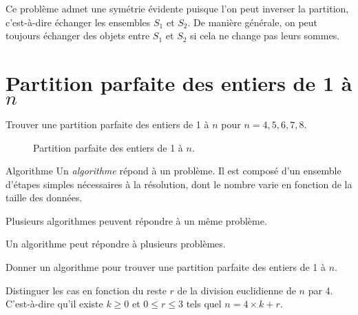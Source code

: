 \documentclass[11pt]{article}
\begin{document}
\begin{remarque}{}
    Ce problème admet une symétrie évidente puisque l'on peut inverser la partition, c'est-à-dire échanger les ensembles $S_1$ et $S_2$.
    De manière générale, on peut toujours échanger des objets entre $S_1$ et $S_2$ si cela ne change pas leurs sommes.
 \end{remarque}

\section{Partition parfaite des entiers de 1 à $n$}

\begin{exercice}{}
  Trouver une partition parfaite des entiers de 1 à $n$ pour $n =4, 5, 6, 7, 8$.
  \end{exercice}


  \begin{figure}[htbp]
    \centering
    \resizebox{0.6\linewidth}{!}{
      
    }
    \caption{Partition parfaite des entiers de 1 à $n$.}
  \end{figure}


  \begin{definition}{Algorithme}
    Un \emph{algorithme} répond à un problème. Il est composé d’un ensemble d’étapes simples nécessaires à la résolution, dont le nombre varie en fonction de la taille des données.
  \end{definition}

  \begin{remarque}{}
    Plusieurs algorithmes peuvent répondre à un même problème.
  \end{remarque}

  \begin{remarque}{}
    Un algorithme peut répondre à plusieurs problèmes.
  \end{remarque}

  \begin{exercice}{}
    Donner un algorithme pour trouver une partition parfaite des entiers de 1 à $n$.
  \end{exercice}

  \begin{indice}
    Distinguer les cas en fonction du reste $r$ de la division euclidienne de $n$ par 4. C'est-à-dire qu'il existe $k \geq 0$ et $0 \leq r \leq 3$ tels quel $n = 4 \times k + r$.
  \end{indice}
\end{document}
